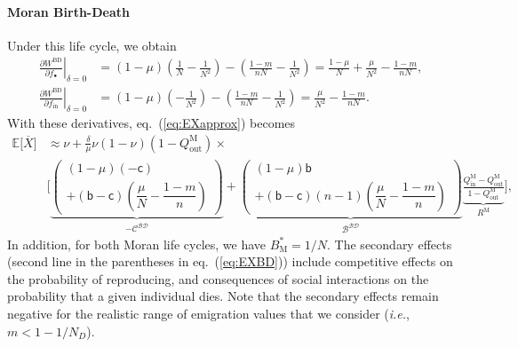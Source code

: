 \documentclass[11pt, letterpaper]{article}
\renewcommand{\eqref}[1]{\textup{{\normalfont eq.~(\ref{#1}}\normalfont)}}
\newcommand{\ie}{\textit{i.e.}}
\newcommand{\deriv}[2]{\partial_{#2}\!{#1}\,}
\newcommand{\derivv}[3]{\left.\frac{\partial #1}{\partial #2}\right |_{#3=0}} %
\newcommand{\Esp}[1]{\mathbb{E}\big[ #1\big]}%
\newcommand{\bb}{\mathsf{b}}
\newcommand{\cc}{\mathsf{c}}
\newcommand{\Moran}{\textrm{M}}
\newcommand{\BD}{\textrm{BD}}
\newcommand{\mutbias}{\nu}
\newcommand{\inn}{\textrm{in}}
\newcommand{\out}{\textrm{out}}
\newcommand{\focal}{\bullet}
\newcommand{\ndemes}{N_D}
\newcommand{\selstr}{\delta}
\begin{document}
\paragraph{Moran Birth-Death}
Under this life cycle, we obtain
\begin{subequations}\label{eq:dWBD}
\begin{align}
\derivv{W^{\BD}}{f_{\focal}}{\selstr} &= (1-\mu) \left(\frac{1}{N} - \frac{1}{N^2}\right) - \left( \frac{1-m}{n N} - \frac{1}{N^2} \right) = \frac{1-\mu}{N} + \frac{\mu}{N^2} - \frac{1-m}{n N}, \\
\derivv{W^{\BD}}{f_{\inn}}{\selstr} &= (1-\mu) \left(- \frac{1}{N^2}\right) - \left( \frac{1-m}{n N} - \frac{1}{N^2} \right) = \frac{\mu}{N^2} - \frac{1-m}{n N}.
\end{align}
\end{subequations}
%
With these derivatives, \eqref{eq:EXapprox} becomes
%
\begin{equation}\label{eq:EXBD}
\begin{split}
\Esp{\overline{X}} & \approx \mutbias + 
\frac{\selstr}{\mu}  \mutbias (1-\mutbias) (1 - Q_{\out}^{\Moran}) \times \\
 &\Bigg[ \underbrace{ \begin{pmatrix}
 (1-\mu) (-\cc) \\
 + (\bb - \cc) \left( \dfrac{\mu}{N} - \dfrac{1-m}{n} \right) 
 \end{pmatrix}
}_{-\mathcal{C^{\BD}}} + \underbrace{ \begin{pmatrix}
(1-\mu) \bb \\
+ (\bb - \cc) (n-1) \left(  \dfrac{\mu}{N} - \dfrac{1-m}{n} \right) 
\end{pmatrix}
}_{\mathcal{B^{\BD}}} \underbrace{\frac{Q_{\inn}^{\Moran} - Q_{\out}^{\Moran}}{1 - Q_{\out}^{\Moran}}}_{R^{\Moran}} \Bigg],
\end{split}
\end{equation}
%
In addition, for both Moran life cycles, we have $B^{*}_\Moran = 1/N$. 
The secondary effects (second line in the parentheses in \eqref{eq:EXBD}) include competitive effects on the probability of reproducing, and consequences of social interactions on the probability that a given individual dies. Note that the secondary effects remain negative for the realistic range of emigration values that we consider (\ie, $m<1 - 1/\ndemes$).
\end{document}
